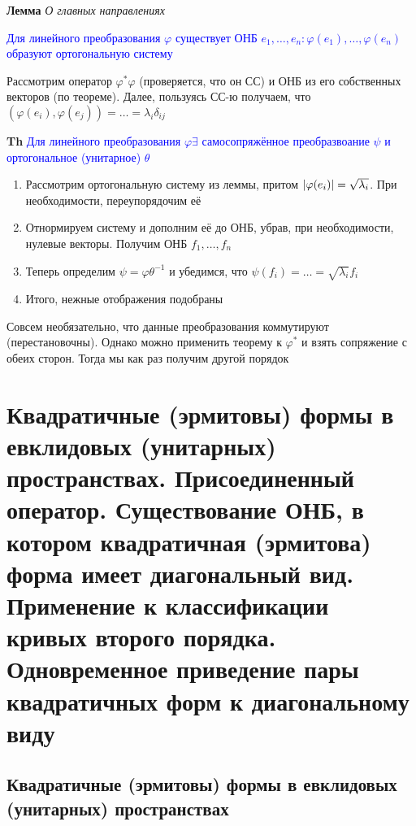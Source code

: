 \documentclass[a4paper, 14pt]{article}
\begin{document}
    \textbf{Лемма} \textit{О главных направлениях}
    
    \textcolor{blue}{Для линейного преобразования $\varphi$ существует
    ОНБ $e_1, \dots, e_n: \varphi(e_1), \dots, \varphi(e_n)$ образуют ортогональную систему}
    
    Рассмотрим оператор $\varphi^* \varphi$ (проверяется, что он СС) и ОНБ из его собственных векторов (по теореме).
    Далее, пользуясь СС-ю получаем, что $(\varphi(e_i), \varphi(e_j)) = \dots = \lambda_i \delta_{ij}$
    
    \textbf{Th} \textcolor{blue}{Для линейного преобразования $\varphi \exists$ самосопряжённое
    преобразвоание $\psi$ и ортогональное (унитарное) $\theta$}
    
    \begin{enumerate}
        \item Рассмотрим ортогональную систему из леммы, притом $\abs{\varphi(e_i)} = \sqrt{\lambda_i}$.
        При необходимости, переупорядочим её
        \item Отнормируем систему и дополним её до ОНБ, убрав, при необходимости, нулевые векторы.
        Получим ОНБ $f_1, \dots, f_n$
        \item Теперь определим $\psi = \varphi \theta^{-1}$ и убедимся, что $\psi(f_i) = \dots = \sqrt{\lambda_i} f_i$
        \item Итого, нежные отображения подобраны
    \end{enumerate}
    
    Совсем необязательно, что данные преобразования коммутируют (перестановочны).
    Однако можно применить теорему к $\varphi^*$ и взять сопряжение с обеих сторон.
    Тогда мы как раз получим другой порядок
    
    \section{Квадратичные (эрмитовы) формы в евклидовых (унитарных) пространствах.
    Присоединенный оператор.
    Существование ОНБ, в котором квадратичная (эрмитова) форма имеет диагональный вид.
    Применение к классификации кривых второго порядка.
    Одновременное приведение пары квадратичных форм к диагональному виду}
    
    \subsection{Квадратичные (эрмитовы) формы в евклидовых (унитарных) пространствах}
    
\end{document}
